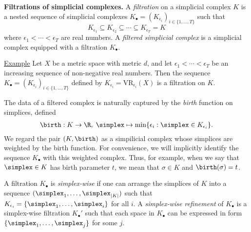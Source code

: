\noindent \textbf{Filtrations of simplicial complexes.} A \emph{filtration} on a simplicial complex $K$ is a nested sequence of  simplicial complexes $K_\bullet = (K_{\epsilon_i})_{i \in\{ 1, \ldots, T\}}$ such that
    $$
    K_{\epsilon_1} \subseteq K_{\epsilon_2} \subseteq \cdots \subseteq K_{\epsilon_T} = K
    $$
where $\epsilon_1 < \cdots < \epsilon_T$ are real numbers. A \emph{filtered simplicial complex} is a simplicial complex equipped with a filtration $K_\bullet$.

\noindent \underline{Example}
 Let  $X$ be a metric space with metric $d$, and let  $\epsilon_1 < \cdots < \epsilon_T$ be an increasing sequence of non-negative real numbers.  Then the sequence $K_\bullet = (K_{\epsilon_i})_{i \in\{ 1, \ldots, T\}}$ defined by $K_{\epsilon_i} = \text{VR}_{\epsilon_i}(X)$ is a filtration on $K$.

The data of a filtered complex is naturally captured by the \emph{birth} function on simplices, defined
    \begin{align*}
        \birth: K \to \R, \; \simplex \mapsto \min\{ \epsilon_i : \simplex \in K_{\epsilon_i} \}.
    \end{align*}
We regard the pair $(K, \birth)$ as a simpilicial complex whose simplices are weighted by the birth function.   For convenience, we will implicitly identify the sequence $K_\bullet$ with this weighted complex.   Thus, for example, when we say that $\simplex \in K$ has birth parameter $t$, we mean that  $\sigma\in K$ and  $\birth(\sigma) = t$.


\begin{definition}
A filtration $K_\bullet$ is \emph{simplex-wise} if one can arrange the simplices of $K$ into a sequence $(\simplex_1, \ldots, \simplex_{|K|})$ such that $K_{\epsilon_i} = \{\simplex_1, \ldots, \simplex_i\}$ for all $i$.  
A \emph{simplex-wise refinement}  of $K_\bullet$ is a simplex-wise filtration $K_\bullet'$ such that each space in $K_\bullet$ can be expressed in form $\{\simplex_1, \ldots, \simplex_j\}$ for some $j$.
\end{definition}
 




